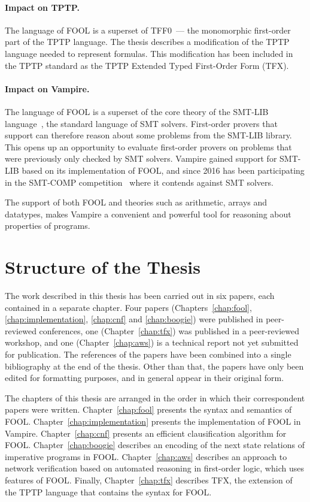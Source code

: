 \paragraph{Impact on TPTP.}
The language of FOOL is a superset of TFF0~--- the monomorphic first-order part of the TPTP language. The thesis describes a modification of the TPTP language needed to represent \folb{} formulas. This modification has been included in the TPTP standard as the TPTP Extended Typed First-Order Form (TFX).

\paragraph{Impact on Vampire.}
The language of FOOL is a superset of the core theory of the SMT-LIB language~\cite{SMT-LIB}, the standard language of SMT solvers. First-order provers that support \folb{} can therefore reason about some problems from the SMT-LIB library. This opens up an opportunity to evaluate first-order provers on problems that were previously only checked by SMT solvers. Vampire gained support for SMT-LIB based on its implementation of FOOL, and since 2016 has been participating in the SMT-COMP competition~\cite{DBLP:conf/cav/BarrettMS05} where it contends against SMT solvers.

The support of both FOOL and theories such as arithmetic, arrays and datatypes, makes Vampire a convenient and powerful tool for reasoning about properties of programs.


\section*{Structure of the Thesis}
\label{sect:intro:overview}

The work described in this thesis has been carried out in six papers, each contained in a separate chapter. Four papers (Chapters~\ref{chap:fool}, \ref{chap:implementation}, \ref{chap:cnf} and \ref{chap:boogie}) were published in peer-reviewed conferences, one (Chapter~\ref{chap:tfx}) was published in a peer-reviewed workshop, and one (Chapter~\ref{chap:aws}) is a technical report not yet submitted for publication. The references of the papers have been combined into a single bibliography at the end of the thesis. Other than that, the papers have only been edited for formatting purposes, and in general appear in their original form.

The chapters of this thesis are arranged in the order in which their correspondent papers were written. Chapter~\ref{chap:fool} presents the syntax and semantics of FOOL. Chapter~\ref{chap:implementation} presents the implementation of FOOL in Vampire. Chapter~\ref{chap:cnf} presents an efficient clausification algorithm for FOOL. Chapter~\ref{chap:boogie} describes an encoding of the next state relations of imperative programs in FOOL. Chapter~\ref{chap:aws} describes an approach to network verification based on automated reasoning in first-order logic, which uses features of FOOL. Finally, Chapter~\ref{chap:tfx} describes TFX, the extension of the TPTP language that contains the syntax for FOOL.

